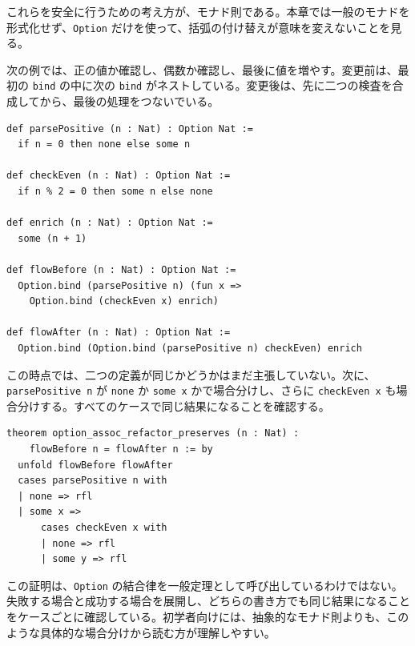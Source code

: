 これらを安全に行うための考え方が、モナド則である。本章では一般のモナドを形式化せず、\texttt{Option} だけを使って、括弧の付け替えが意味を変えないことを見る。


次の例では、正の値か確認し、偶数か確認し、最後に値を増やす。変更前は、最初の \texttt{bind} の中に次の \texttt{bind} がネストしている。変更後は、先に二つの検査を合成してから、最後の処理をつないでいる。

\begin{listing}[htbp]
\begin{verbatim}
def parsePositive (n : Nat) : Option Nat :=
  if n = 0 then none else some n

def checkEven (n : Nat) : Option Nat :=
  if n % 2 = 0 then some n else none

def enrich (n : Nat) : Option Nat :=
  some (n + 1)

def flowBefore (n : Nat) : Option Nat :=
  Option.bind (parsePositive n) (fun x =>
    Option.bind (checkEven x) enrich)

def flowAfter (n : Nat) : Option Nat :=
  Option.bind (Option.bind (parsePositive n) checkEven) enrich
\end{verbatim}
\caption{\texttt{Option.bind} の結合的なリファクタリング}
\label{lst:ch28-option-assoc}
\end{listing}

この時点では、二つの定義が同じかどうかはまだ主張していない。次に、\texttt{parsePositive n} が \texttt{none} か \texttt{some x} かで場合分けし、さらに \texttt{checkEven x} も場合分けする。すべてのケースで同じ結果になることを確認する。

\begin{listing}[htbp]
\begin{verbatim}
theorem option_assoc_refactor_preserves (n : Nat) :
    flowBefore n = flowAfter n := by
  unfold flowBefore flowAfter
  cases parsePositive n with
  | none => rfl
  | some x =>
      cases checkEven x with
      | none => rfl
      | some y => rfl
\end{verbatim}
\caption{失敗を含む処理の括弧変更が意味を保存すること}
\label{lst:ch28-option-assoc-proof}
\end{listing}

\begin{leanbox}
この証明は、\texttt{Option} の結合律を一般定理として呼び出しているわけではない。失敗する場合と成功する場合を展開し、どちらの書き方でも同じ結果になることをケースごとに確認している。初学者向けには、抽象的なモナド則よりも、このような具体的な場合分けから読む方が理解しやすい。
\end{leanbox}

